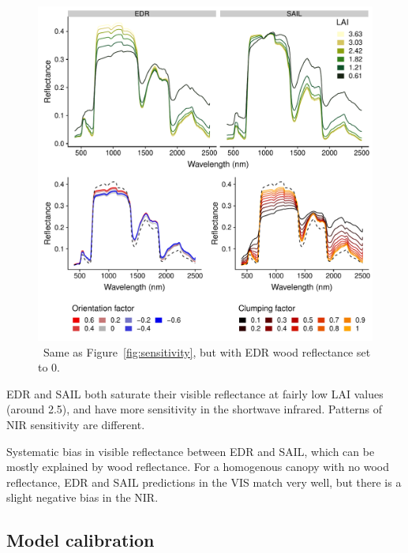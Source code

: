 \begin{figure}
  \centering
  \includegraphics[width=\textwidth]{4_edr/figures/explore_spectra/sensitivity_single_pft_nowood.pdf}
  \caption{\
    Same as Figure~\ref{fig:sensitivity}, but with EDR wood reflectance set to 0. 
  }\label{fig:sensitivity_nowood}
\end{figure}

EDR and SAIL both saturate their visible reflectance at fairly low LAI values (around 2.5),
and have more sensitivity in the shortwave infrared.
Patterns of NIR sensitivity are different.

Systematic bias in visible reflectance between EDR and SAIL, which can be mostly explained by wood reflectance.
For a homogenous canopy with no wood reflectance, EDR and SAIL predictions in the VIS match very well, but there is a slight negative bias in the NIR.

\subsection{Model calibration}

